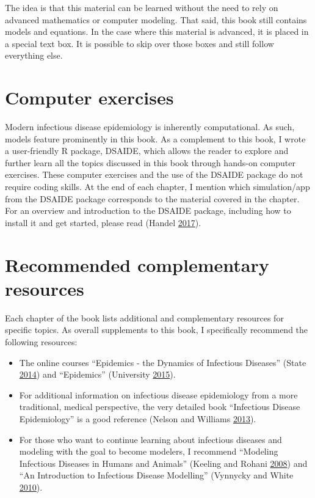 \documentclass[]{book}
\providecommand{\tightlist}{%
  \setlength{\itemsep}{0pt}\setlength{\parskip}{0pt}}
\theoremstyle{definition}
\theoremstyle{definition}
\theoremstyle{definition}
\theoremstyle{remark}
\begin{document}
The idea is that this material can be learned without the need to rely
on advanced mathematics or computer modeling. That said, this book still
contains models and equations. In the case where this material is
advanced, it is placed in a special text box. It is possible to skip
over those boxes and still follow everything else.

\section{Computer exercises}\label{computer-exercises}

Modern infectious disease epidemiology is inherently computational. As
such, models feature prominently in this book. As a complement to this
book, I wrote a user-friendly R package, DSAIDE, which allows the reader
to explore and further learn all the topics discussed in this book
through hands-on computer exercises. These computer exercises and the
use of the DSAIDE package do not require coding skills. At the end of
each chapter, I mention which simulation/app from the DSAIDE package
corresponds to the material covered in the chapter. For an overview and
introduction to the DSAIDE package, including how to install it and get
started, please read (Handel \protect\hyperlink{ref-handel17}{2017}).

\section{Recommended complementary
resources}\label{recommended-complementary-resources}

Each chapter of the book lists additional and complementary resources
for specific topics. As overall supplements to this book, I specifically
recommend the following resources:

\begin{itemize}
\tightlist
\item
  The online courses ``Epidemics - the Dynamics of Infectious Diseases''
  (State \protect\hyperlink{ref-epimooc}{2014}) and ``Epidemics''
  (University \protect\hyperlink{ref-hkepidemics}{2015}).
\item
  For additional information on infectious disease epidemiology from a
  more traditional, medical perspective, the very detailed book
  ``Infectious Disease Epidemiology'' is a good reference (Nelson and
  Williams \protect\hyperlink{ref-nelson13}{2013}).
\item
  For those who want to continue learning about infectious diseases and
  modeling with the goal to become modelers, I recommend ``Modeling
  Infectious Diseases in Humans and Animals'' (Keeling and Rohani
  \protect\hyperlink{ref-keeling08}{2008}) and ``An Introduction to
  Infectious Disease Modelling'' (Vynnycky and White
  \protect\hyperlink{ref-vynnycky10}{2010}).
\end{itemize}
\end{document}
